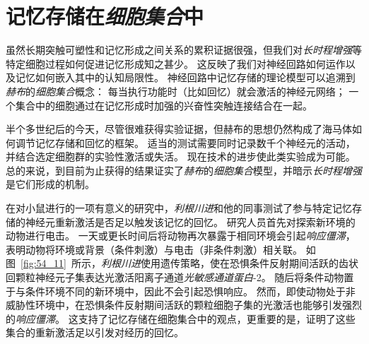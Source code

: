 \section{记忆存储在\textit{细胞集合}中}

虽然长期突触可塑性和记忆形成之间关系的累积证据很强，但我们对\textit{长时程增强}等特定细胞过程如何促进记忆形成知之甚少。
这反映了我们对神经回路如何运作以及记忆如何嵌入其中的认知局限性。
神经回路中记忆存储的理论模型可以追溯到\textit{赫布}的\textit{细胞集合}概念：
每当执行功能时（比如回忆）就会激活的神经元网络；
一个集合中的细胞通过在记忆形成时加强的兴奋性突触连接结合在一起。


半个多世纪后的今天，尽管很难获得实验证据，但赫布的思想仍然构成了海马体如何调节记忆存储和回忆的框架。
适当的测试需要同时记录数千个神经元的活动，并结合选定细胞群的实验性激活或失活。
现在技术的进步使此类实验成为可能。
总的来说，到目前为止获得的结果证实了\textit{赫布}的\textit{细胞集合}模型，并暗示\textit{长时程增强}是它们形成的机制。


在对小鼠进行的一项有意义的研究中，\textit{利根川进}和他的同事测试了参与特定记忆存储的神经元重新激活是否足以触发该记忆的回忆。
研究人员首先对探索新环境的动物进行电击。
一天或更长时间后将动物再次暴露于相同环境会引起\textit{响应僵滞}，表明动物将环境或背景（条件刺激）与电击（非条件刺激）相关联。
如图~\ref{fig:54_11}~所示，\textit{利根川进}使用遗传策略，使在恐惧条件反射期间活跃的齿状回颗粒神经元子集表达光激活阳离子通道\textit{光敏感通道蛋白}-2。
随后将条件动物置于与条件环境不同的新环境中，因此不会引起恐惧响应。
然而，即使动物处于非威胁性环境中，在恐惧条件反射期间活跃的颗粒细胞子集的光激活也能够引发强烈的\textit{响应僵滞}。
这支持了记忆存储在细胞集合中的观点，更重要的是，证明了这些集合的重新激活足以引发对经历的回忆。


